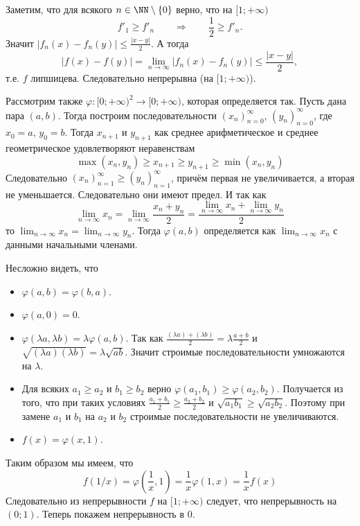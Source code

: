 \documentclass[12pt,a4paper]{article}
\begin{document}
\begin{enumproblem}
        Заметим, что для всякого $n \in \NN \setminus \{0\}$ верно, что на $[1; + \infty)$
        \[f'_1 \geqslant f'_n\qquad \Longrightarrow\qquad \frac{1}{2} \geqslant f'_n.\]
        Значит $|f_n(x) - f_n(y)| \leqslant \frac{|x - y|}{2}$. А тогда
        \[|f(x) - f(y)| = \lim_{n \to \infty} |f_n(x) - f_n(y)| \leqslant \frac{|x - y|}{2},\]
        т.е. $f$ липшицева. Следовательно непрерывна (на $[1; + \infty)$).

        Рассмотрим также $\varphi: [0; + \infty)^2 \to [0; + \infty)$, которая определяется так. Пусть дана пара $(a, b)$. Тогда построим последовательности $(x_n)_{n=0}^\infty$, $(y_n)_{n=0}^\infty$, где $x_0 = a$, $y_0 = b$. Тогда $x_{n+1}$ и $y_{n+1}$ как среднее арифметическое и среднее геометрическое удовлетворяют неравенствам
        \[\max(x_n, y_n) \geqslant x_{n+1} \geqslant y_{n+1} \geqslant \min(x_n, y_n)\]
        Следовательно $(x_n)_{n=1}^\infty \geqslant (y_n)_{n=1}^\infty$, причём первая не увеличивается, а вторая не уменьшается. Следовательно они имеют предел. И так как
        \[\lim_{n \to \infty} x_n = \lim_{n \to \infty} \frac{x_n + y_n}{2} = \frac{\lim_{n \to \infty} x_n + \lim_{n \to \infty} y_n}{2}\]
        то $\lim_{n \to \infty} x_n = \lim_{n \to \infty} y_n$. Тогда $\varphi(a, b)$ определяется как $\lim_{n \to \infty} x_n$ с данными начальными членами.

        Несложно видеть, что
        \begin{itemize}
            \item $\varphi(a, b) = \varphi(b, a)$.
            \item $\varphi(a, 0) = 0$.
            \item $\varphi(\lambda a, \lambda b) = \lambda \varphi(a, b)$. Так как $\frac{(\lambda a) + (\lambda b)}{2} = \lambda \frac{a + b}{2}$ и $\sqrt{(\lambda a)(\lambda b)} = \lambda \sqrt{ab}$. Значит строимые последовательности умножаются на $\lambda$.
            \item Для всяких $a_1 \geqslant a_2$ и $b_1 \geqslant b_2$ верно $\varphi(a_1, b_1) \geqslant \varphi(a_2, b_2)$. Получается из того, что при таких условиях $\frac{a_1 + b_1}{2} \geqslant \frac{a_2 + b_2}{2}$ и $\sqrt{a_1 b_1} \geqslant \sqrt{a_2 b_2}$. Поэтому при замене $a_1$ и $b_1$ на $a_2$ и $b_2$ строимые последовательности не увеличиваются.
            \item $f(x) = \varphi(x, 1)$.
        \end{itemize}

        Таким образом мы имеем, что
        \[f(1/x) = \varphi\left(\frac{1}{x}, 1\right) = \frac{1}{x} \varphi(1, x) = \frac{1}{x} f(x)\]
        Следовательно из непрерывности $f$ на $[1; +\infty)$ следует, что непрерывность на $(0; 1)$. Теперь покажем непрерывность в $0$.


\end{enumproblem}
\end{document}

